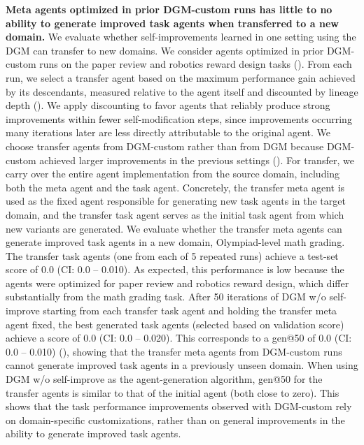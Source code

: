 \documentclass[]{fairmeta}
\begin{document}
\textbf{Meta agents optimized in prior DGM-custom runs has little to no ability to generate improved task agents when transferred to a new domain.}
We evaluate whether self-improvements learned in one setting using the DGM can transfer to new domains. We consider agents optimized in prior DGM-custom runs on the paper review and robotics reward design tasks (). From each run, we select a transfer agent based on the maximum performance gain achieved by its descendants, measured relative to the agent itself and discounted by lineage depth (). We apply discounting to favor agents that reliably produce strong improvements within fewer self-modification steps, since improvements occurring many iterations later are less directly attributable to the original agent. We choose transfer agents from DGM-custom rather than from DGM because DGM-custom achieved larger improvements in the previous settings ().
For transfer, we carry over the entire agent implementation from the source domain, including both the meta agent and the task agent. Concretely, the transfer meta agent is used as the fixed agent responsible for generating new task agents in the target domain, and the transfer task agent serves as the initial task agent from which new variants are generated.
We evaluate whether the transfer meta agents can generate improved task agents in a new domain, Olympiad-level math grading. The transfer task agents (one from each of 5 repeated runs) achieve a test-set score of 0.0 (CI: 0.0 -- 0.010). As expected, this performance is low because the agents were optimized for paper review and robotics reward design, which differ substantially from the math grading task.
After 50 iterations of DGM w/o self-improve starting from each transfer task agent and holding the transfer meta agent fixed, the best generated task agents (selected based on validation score) achieve a score of 0.0 (CI: 0.0 -- 0.020). This corresponds to a gen@50 of 0.0 (CI: 0.0 -- 0.010) (), showing that the transfer meta agents from DGM-custom runs cannot generate improved task agents in a previously unseen domain.
When using DGM w/o self-improve as the agent-generation algorithm, gen@50 for the transfer agents is similar to that of the initial agent (both close to zero). This shows that the task performance improvements observed with DGM-custom rely on domain-specific customizations, rather than on general improvements in the ability to generate improved task agents.
\end{document}
